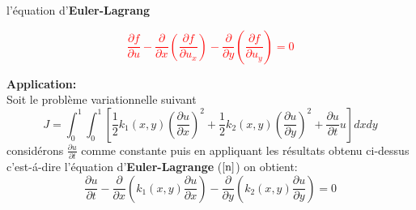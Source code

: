 \documentclass[12pt]{beamer}
\begin{document}
\begin{frame} l'\'{e}quation d'\textbf{Euler-Lagrang}
\begin{block}
	
\textcolor{red}{	
	\begin{equation}
	\frac{\partial{f}}{\partial{u}}-\dfrac{\partial}{\partial{x}}(\dfrac{\partial{f}}{\partial{u}_{x}})-\frac{\partial}{\partial{y}}(\dfrac{\partial{f}}{\partial{u}_{y}})=0 \label{n}
	\end{equation}}
\end{block}
\textbf{\large{Application:}}\\
Soit le probl\`{e}me variationnelle suivant \begin{equation}J=\int_{0}^{1}\int_{0}^{1} [\frac{1}{2} k_{1}(x,y)(\dfrac{\partial{u}}{\partial{x}})^{2}+\frac{1}{2}k_{2}(x,y)(\dfrac{\partial{u}}{\partial{y}})^{2}+\frac{\partial{u}}{\partial{t}}u]dxdy \end{equation}
consid\'{e}rons $\frac{\partial{u}}{\partial{t}}$ comme constante puis
en appliquant les résultats obtenu ci-dessus c'est-\'{a}-dire l'\'{e}quation d'\textbf{Euler-Lagrange} ($\ref{n}$)  on obtient: \begin{equation}
\dfrac{\partial{u}}{\partial{t}}-\frac{\partial}{\partial{x}}(k_{1}(x,y)\frac{\partial{u}}{\partial{x}})-\frac{\partial}{\partial{y}}(k_{2}(x,y)\frac{\partial{u}}{\partial{y}})=0\label{**-}\end{equation}
\end{frame}
\end{document}
